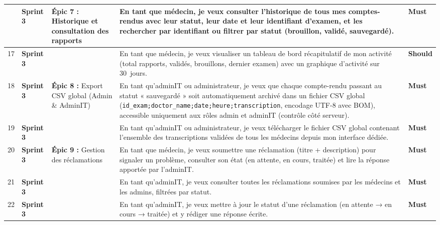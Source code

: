 \documentclass[12pt,a4paper]{article}
\newcommand{\must}{\textcolor{must}{\textbf{Must}}}
\newcommand{\should}{\textcolor{should}{\textbf{Should}}}
\newcommand{\sprintthree}[1]{\cellcolor{sprint3bg}\textcolor{sprint3txt}{\textbf{#1}}}
\begin{document}
\begin{longtable}{
  |>{\centering\arraybackslash}p{0.7cm}
  |>{\centering\arraybackslash}p{2.2cm}
  |p{3.8cm}
  |p{6.8cm}
  |>{\centering\arraybackslash}p{1.4cm}|
}
16 & \sprintthree{Sprint 3}
   & \multirow{2}{3.8cm}{\textbf{Épic 7 :} Historique et consultation des rapports}
   & En tant que médecin, je veux consulter l'historique de tous mes comptes-rendus avec leur statut, leur date et leur identifiant d'examen, et les rechercher par identifiant ou filtrer par statut (brouillon, validé, sauvegardé).
   & \must \\ \cline{1-2}\cline{4-5}

17 & \sprintthree{Sprint 3} &
   & En tant que médecin, je veux visualiser un tableau de bord récapitulatif de mon activité (total rapports, validés, brouillons, dernier examen) avec un graphique d'activité sur 30~jours.
   & \should \\ \hline

18 & \sprintthree{Sprint 3}
   & \multirow{2}{3.8cm}{\textbf{Épic 8 :} Export CSV global (Admin \& AdminIT)}
   & En tant qu'adminIT ou administrateur, je veux que chaque compte-rendu passant au statut « sauvegardé » soit automatiquement archivé dans un fichier CSV global (\texttt{id\_exam;doctor\_name;date;heure;transcription}, encodage UTF-8 avec BOM), accessible uniquement aux rôles admin et adminIT (contrôle côté serveur).
   & \must \\ \cline{1-2}\cline{4-5}

19 & \sprintthree{Sprint 3} &
   & En tant qu'adminIT ou administrateur, je veux télécharger le fichier CSV global contenant l'ensemble des transcriptions validées de tous les médecins depuis mon interface dédiée.
   & \must \\ \hline

20 & \sprintthree{Sprint 3}
   & \multirow{3}{3.8cm}{\textbf{Épic 9 :} Gestion des réclamations}
   & En tant que médecin, je veux soumettre une réclamation (titre + description) pour signaler un problème, consulter son état (en attente, en cours, traitée) et lire la réponse apportée par l'adminIT.
   & \must \\ \cline{1-2}\cline{4-5}

21 & \sprintthree{Sprint 3} &
   & En tant qu'adminIT, je veux consulter toutes les réclamations soumises par les médecins et les admins, filtrées par statut.
   & \must \\ \cline{1-2}\cline{4-5}

22 & \sprintthree{Sprint 3} &
   & En tant qu'adminIT, je veux mettre à jour le statut d'une réclamation (en attente → en cours → traitée) et y rédiger une réponse écrite.
   & \must \\ \hline


\end{longtable}
\end{document}
